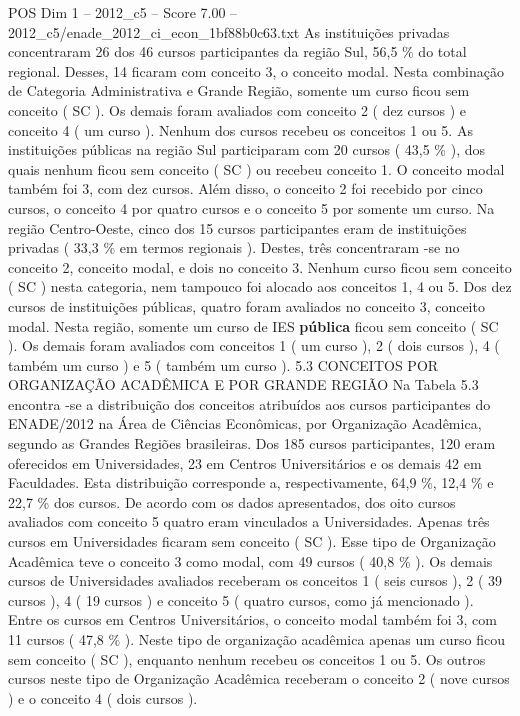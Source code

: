 \begin{textsample}{POS Dim 1 – 2012\_c5 – Score 7.00 – 2012\_c5/enade\_2012\_ci\_econ\_1bf88b0c63.txt}
As instituições privadas concentraram 26 dos 46 cursos participantes da região Sul, 56,5 \% do total regional.
Desses, 14 ficaram com conceito 3, o conceito modal.
Nesta combinação de Categoria Administrativa e Grande Região, somente um curso ficou sem conceito ( SC ).
Os demais foram avaliados com conceito 2 ( dez cursos ) e conceito 4 ( um curso ).
Nenhum dos cursos recebeu os conceitos 1 ou 5.
As instituições públicas na região Sul participaram com 20 cursos ( 43,5 \% ), dos quais nenhum ficou sem conceito ( SC ) ou recebeu conceito 1.
O conceito modal também foi 3, com dez cursos.
Além disso, o conceito 2 foi recebido por cinco cursos, o conceito 4 por quatro cursos e o conceito 5 por somente um curso.
Na região Centro-Oeste, cinco dos 15 cursos participantes eram de instituições privadas ( 33,3 \% em termos regionais ).
Destes, três concentraram -se no conceito 2, conceito modal, e dois no conceito 3.
Nenhum curso ficou sem conceito ( SC ) nesta categoria, nem tampouco foi alocado aos conceitos 1, 4 ou 5.
Dos dez cursos de instituições públicas, quatro foram avaliados no conceito 3, conceito modal.
Nesta região, somente um curso de IES \textbf{pública} ficou sem conceito ( SC ).
Os demais foram avaliados com conceitos 1 ( um curso ), 2 ( dois cursos ), 4 ( também um curso ) e 5 ( também um curso ). 5.3 CONCEITOS POR ORGANIZAÇÃO ACADÊMICA E POR GRANDE REGIÃO Na Tabela 5.3 encontra -se a distribuição dos conceitos atribuídos aos cursos participantes do ENADE/2012 na Área de Ciências Econômicas, por Organização Acadêmica, segundo as Grandes Regiões brasileiras.
Dos 185 cursos participantes, 120 eram oferecidos em Universidades, 23 em Centros Universitários e os demais 42 em Faculdades.
Esta distribuição corresponde a, respectivamente, 64,9 \%, 12,4 \% e 22,7 \% dos cursos.
De acordo com os dados apresentados, dos oito cursos avaliados com conceito 5 quatro eram vinculados a Universidades.
Apenas três cursos em Universidades ficaram sem conceito ( SC ).
Esse tipo de Organização Acadêmica teve o conceito 3 como modal, com 49 cursos ( 40,8 \% ).
Os demais cursos de Universidades avaliados receberam os conceitos 1 ( seis cursos ), 2 ( 39 cursos ), 4 ( 19 cursos ) e conceito 5 ( quatro cursos, como já mencionado ).
Entre os cursos em Centros Universitários, o conceito modal também foi 3, com 11 cursos ( 47,8 \% ).
Neste tipo de organização acadêmica apenas um curso ficou sem conceito ( SC ), enquanto nenhum recebeu os conceitos 1 ou 5.
Os outros cursos neste tipo de Organização Acadêmica receberam o conceito 2 ( nove cursos ) e o conceito 4 ( dois cursos ).

\end{textsample}
